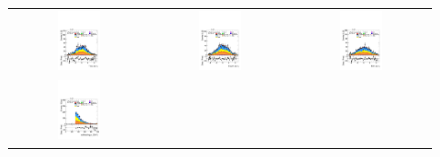 \begin{figure}[htbp]
    \centering
    \setlength{\tabcolsep}{1.5pt}
    \renewcommand{\arraystretch}{0}
  
    \begin{tabular}{@{}c c c@{}}
      \includegraphics[width=0.33\textwidth]{images/modelling_tmva_vars/plot_jet_2_eta_hh_tth.pdf} &
      \includegraphics[width=0.33\textwidth]{images/modelling_tmva_vars/plot_jet_3_eta_hh_tth.pdf} &
      \includegraphics[width=0.33\textwidth]{images/modelling_tmva_vars/plot_jet_4_eta_hh_tth.pdf} \\[4pt]
      \includegraphics[width=0.33\textwidth]{images/modelling_tmva_vars/plot_tau_1_pt_hh_tth.pdf} &

\end{tabular}
\end{figure}
